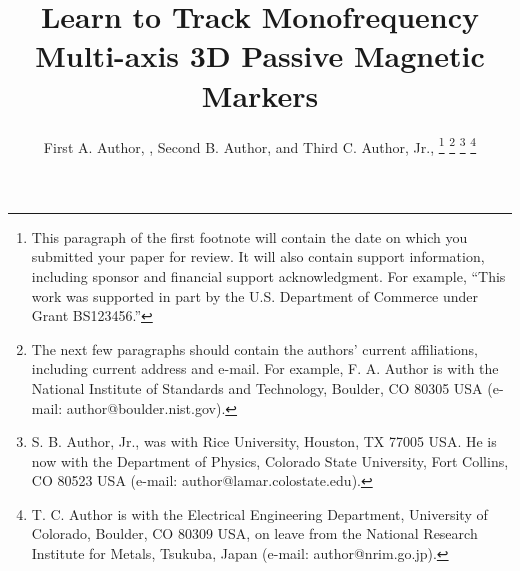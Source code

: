 \documentclass[journal,twoside,web]{ieeecolor}
\begin{document}
\title{Learn to Track Monofrequency Multi-axis 3D Passive Magnetic Markers}
\author{First A. Author, , Second B. Author, and Third C. Author, Jr., 
\thanks{This paragraph of the first footnote will contain the date on 
which you submitted your paper for review. It will also contain support 
information, including sponsor and financial support acknowledgment. For 
example, ``This work was supported in part by the U.S. Department of 
Commerce under Grant BS123456.'' }
\thanks{The next few paragraphs should contain 
the authors' current affiliations, including current address and e-mail. For 
example, F. A. Author is with the National Institute of Standards and 
Technology, Boulder, CO 80305 USA (e-mail: author@boulder.nist.gov). }
\thanks{S. B. Author, Jr., was with Rice University, Houston, TX 77005 USA. He is 
now with the Department of Physics, Colorado State University, Fort Collins, 
CO 80523 USA (e-mail: author@lamar.colostate.edu).}
\thanks{T. C. Author is with 
the Electrical Engineering Department, University of Colorado, Boulder, CO 
80309 USA, on leave from the National Research Institute for Metals, 
Tsukuba, Japan (e-mail: author@nrim.go.jp).}}
\end{document}
